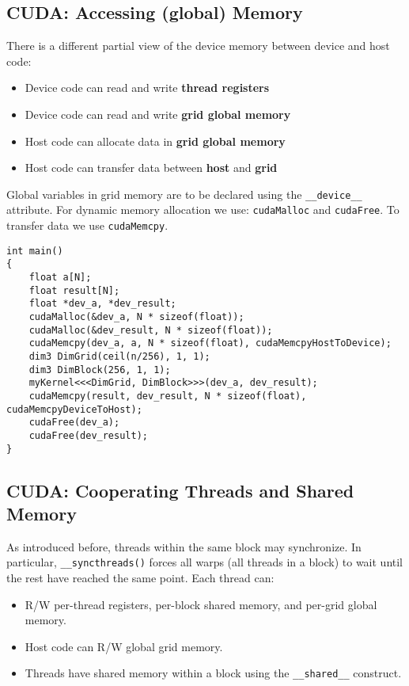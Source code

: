\subsection{CUDA: Accessing (global) Memory}
There is a different partial view of the device memory between device and host code:
\begin{multicols}{2}
    \begin{itemize}
        \item Device code can read and write \textbf{thread registers}
        \item Device code can read and write \textbf{grid global memory}
        \item Host code can allocate data in \textbf{grid global memory}
        \item Host code can transfer data between \textbf{host} and \textbf{grid}
    \end{itemize}
\end{multicols}
Global variables in grid memory are to be declared using the \texttt{\_\_device\_\_} attribute.
For dynamic memory allocation we use: \texttt{cudaMalloc} and \texttt{cudaFree}.
To transfer data we use \texttt{cudaMemcpy}.
\begin{lstlisting}[style=cuda,caption={Example of a kernel definition and call.}]
int main()
{
    float a[N];
    float result[N];
    float *dev_a, *dev_result;
    cudaMalloc(&dev_a, N * sizeof(float));
    cudaMalloc(&dev_result, N * sizeof(float));
    cudaMemcpy(dev_a, a, N * sizeof(float), cudaMemcpyHostToDevice);
    dim3 DimGrid(ceil(n/256), 1, 1);
    dim3 DimBlock(256, 1, 1);
    myKernel<<<DimGrid, DimBlock>>>(dev_a, dev_result);
    cudaMemcpy(result, dev_result, N * sizeof(float), cudaMemcpyDeviceToHost);
    cudaFree(dev_a);
    cudaFree(dev_result);
}
\end{lstlisting}

\subsection{CUDA: Cooperating Threads and Shared Memory}

As introduced before, threads within the same block may synchronize.
In particular, \texttt{\_\_syncthreads()} forces all warps (all threads in a block) to wait until the rest have reached the same point.
Each thread can:
\begin{itemize}
    \item R/W per-thread registers, per-block shared memory, and per-grid global memory.
    \item Host code can R/W global grid memory.
    \item Threads have shared memory within a block using the \texttt{\_\_shared\_\_} construct.
\end{itemize}
